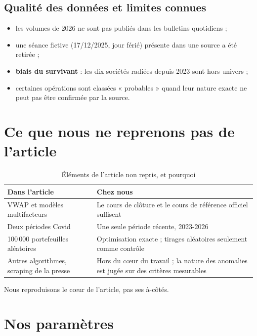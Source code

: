 \documentclass[11pt,a4paper]{article}
\begin{document}
\subsection{Qualité des données et limites connues}
\begin{itemize}
  \item les volumes de 2026 ne sont pas publiés dans les bulletins quotidiens ;
  \item une séance fictive (17/12/2025, jour férié) présente dans une source a été retirée ;
  \item \textbf{biais du survivant} : les dix sociétés radiées depuis 2023 sont hors univers ;
  \item certaines opérations sont classées « probables » quand leur nature exacte ne peut pas être confirmée par la source.
\end{itemize}

\section{Ce que nous ne reprenons pas de l'article}\label{sec:non-repris}
\begin{table}[H]\centering\small
\caption{Éléments de l'article non repris, et pourquoi}\label{tab:non-repris}
\begin{tabular}{p{5.5cm}p{8.5cm}}\toprule
Dans l'article & Chez nous \\ \midrule
VWAP et modèles multifacteurs & Le cours de clôture et le cours de référence officiel suffisent \\
Deux périodes Covid & Une seule période récente, 2023-2026 \\
100\,000 portefeuilles aléatoires & Optimisation exacte ; tirages aléatoires seulement comme contrôle \\
Autres algorithmes, scraping de la presse & Hors du cœur du travail ; la nature des anomalies est jugée sur des critères mesurables \\
\bottomrule\end{tabular}
\end{table}
Nous reproduisons le cœur de l'article, pas ses à-côtés.

\section{Nos paramètres}\label{sec:features}
\end{document}
